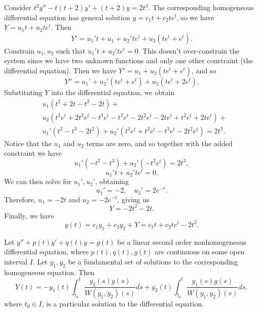 \begin{exmp}
    Consider $t^2y'' - t(t+2)y' + (t+2)y = 2t^3$. The corresponding homogeneous differential equation has general solution $y = c_1t + c_2te^t$, so we have $Y = u_1t + u_2te^t$. Then
    \begin{align*}
        Y' = u_1't + u_1 + u_2'te^t + u_2(te^t + e^t).
    \end{align*}
    Constrain $u_1, u_2$ such that $u_1't + u_2'te^t = 0$. This doesn't over-constrain the system since we have two unknown functions and only one other constraint (the differential equation). Then we have $Y' = u_1 + u_2(te^t + e^t)$, and so
    \[Y'' = u_1' + u_2'(te^t + e^t) + u_2(te^t + 2e^t).\]
    Substituting $Y$ into the differential equation, we obtain
    \begin{align*}
        &u_1(t^2 + 2t - t^2 - 2t) + \\
        &u_2(t^3e^t + 2t^2e^t - t^3e^t - t^2e^t - 2t^2e^t - 2te^t + t^2e^t + 2te^t) + \\
        &u_1'(t^2 - t^3 - 2t^2) + u_2'(t^3e^t + t^2e^t - t^3e^t - 2t^2e^t) = 2t^3.
    \end{align*}
    Notice that the $u_1$ and $u_2$ terms are zero, and so together with the added constraint we have
    \[u_1'(-t^2 - t^3) + u_2'(-t^2e^t) = 2t^3,\]
    \[u_1't + u_2'te^t = 0.\]
    We can then solve for $u_1', u_2'$, obtaining
    \[u_1' = -2, \quad u_2' = 2e^{-t}.\]
    Therefore, $u_1 = -2t$ and $u_2 = -2e^{-t}$, giving us
    \[Y = -2t^2 - 2t.\] Finally, we have
    \[y(t) = c_1y_1 + c_2y_2 + Y = c_1t + c_2te^t - 2t^2.\]
\end{exmp}

\begin{thm}
    Let $y'' + p(t)y' + q(t)y = g(t)$ be a linear second order nonhomogeneous differential equation, where $p(t), q(t), g(t)$ are continuous on some open interval $I$. Let $y_1, y_2$ be a fundamental set of solutions to the corresponding homogeneous equation. Then
    \[Y(t) = -y_1(t)\int_{t_0}^t\frac{y_2(s)g(s)}{W(y_1,y_2)(s)}ds + y_2(t)\int_{t_0}^t\frac{y_1(s)g(s)}{W(y_1,y_2)(s)}ds,\] where $t_0 \in I$, is a particular solution to the differential equation.
\end{thm}

